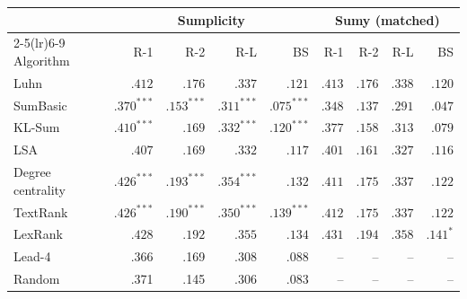 \begin{tabular}{l r r r r r r r r}
\toprule
 & \multicolumn{4}{c}{Sumplicity} & \multicolumn{4}{c}{Sumy (matched)} \\
\cmidrule(lr){2-5}\cmidrule(lr){6-9}
Algorithm & R-1 & R-2 & R-L & BS & R-1 & R-2 & R-L & BS \\
\midrule
Luhn & $.412$ & $.176$ & $.337$ & $.121$ & $.413$ & $.176$ & $.338$ & $.120$ \\
SumBasic & $\mathbf{.370}^{***}$ & $\mathbf{.153}^{***}$ & $\mathbf{.311}^{***}$ & $\mathbf{.075}^{***}$ & $.348$ & $.137$ & $.291$ & $.047$ \\
KL-Sum & $\mathbf{.410}^{***}$ & $.169$ & $\mathbf{.332}^{***}$ & $\mathbf{.120}^{***}$ & $.377$ & $.158$ & $.313$ & $.079$ \\
LSA & $.407$ & $.169$ & $.332$ & $.117$ & $.401$ & $.161$ & $.327$ & $.116$ \\
Degree centrality & $\mathbf{.426}^{***}$ & $\mathbf{.193}^{***}$ & $\mathbf{.354}^{***}$ & $.132$ & $.411$ & $.175$ & $.337$ & $.122$ \\
TextRank & $\mathbf{.426}^{***}$ & $\mathbf{.190}^{***}$ & $\mathbf{.350}^{***}$ & $\mathbf{.139}^{***}$ & $.412$ & $.175$ & $.337$ & $.122$ \\
LexRank & $.428$ & $.192$ & $.355$ & $.134$ & $.431$ & $.194$ & $.358$ & $\mathbf{.141}^{*}$ \\
\midrule
Lead-4 & .366 & .169 & .308 & .088 & -- & -- & -- & -- \\
Random & .371 & .145 & .306 & .083 & -- & -- & -- & -- \\
\bottomrule
\end{tabular}
